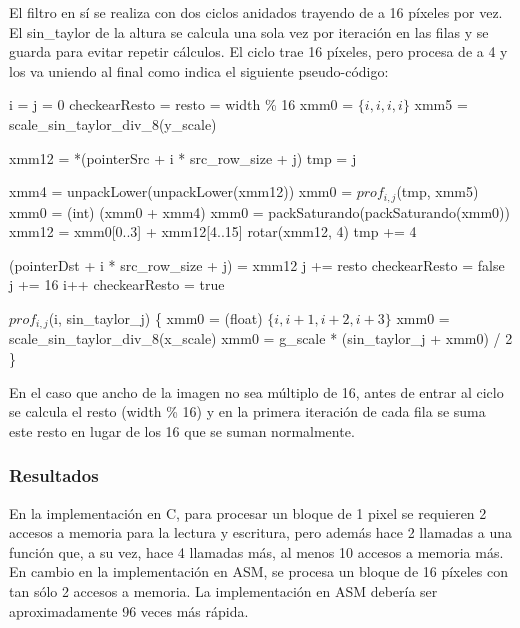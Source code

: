 El filtro en sí se realiza con dos ciclos anidados trayendo de a 16 píxeles por vez.
El sin\_taylor de la altura se calcula una sola vez por iteración en las filas y se guarda para evitar repetir cálculos.
El ciclo trae 16 píxeles, pero procesa de a 4 y los va uniendo al final como indica el siguiente pseudo-código:

\begin{pseudocodigo}
	\STATE i = j = 0
	\STATE checkearResto = resto = width \% 16
		\STATE xmm0 = $\{i, i, i, i\}$
		\STATE xmm5 = scale\_sin\_taylor\_div\_8(y\_scale)
		
			\STATE xmm12 = *(pointerSrc + i * src\_row\_size + j) 
			\STATE tmp = j
			
				\STATE xmm4 = unpackLower(unpackLower(xmm12)) 
				\STATE xmm0 = $prof_{i,j}$(tmp, xmm5)
				\STATE xmm0 = (int) (xmm0 + xmm4)
				\STATE xmm0 = packSaturando(packSaturando(xmm0)) 
				\STATE xmm12 = xmm0[0..3] + xmm12[4..15]
				\STATE rotar(xmm12, 4) 
				\STATE tmp += 4
			\ENDFOR
			
			\STATE *(pointerDst + i * src\_row\_size + j) = xmm12 
				\STATE j += resto
				\STATE checkearResto = false
			\ELSE
				\STATE j += 16
			\ENDIF
		\ENDWHILE
		\STATE i++
		\STATE checkearResto = true
	\ENDWHILE
	
	\STATE $prof_{i, j}$(i, sin\_taylor\_j) \{
		\INDSTATE[2] xmm0 = (float) $\{i, i+1, i+2, i+3\}$
		\INDSTATE[2] xmm0 = scale\_sin\_taylor\_div\_8(x\_scale)
		\INDSTATE[2] xmm0 = g\_scale * (sin\_taylor\_j + xmm0) / 2
	\STATE \}
\end{pseudocodigo}

En el caso que ancho de la imagen no sea múltiplo de 16, antes de entrar al ciclo se calcula el resto (width \% 16) y en la primera iteración de cada fila se suma este resto en lugar de los 16 que se suman normalmente. 

\subsubsection{Resultados}

En la implementación en C, para procesar un bloque de 1 pixel se requieren 2 accesos a memoria para la lectura y escritura, pero además hace 2 llamadas a una función que, a su vez, hace 4 llamadas más, al menos 10 accesos a memoria más.
En cambio en la implementación en ASM, se procesa un bloque de 16 píxeles con tan sólo 2 accesos a memoria. La implementación en ASM debería ser aproximadamente 96 veces más rápida.

